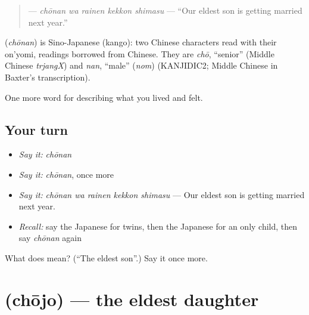\begin{quote}
\textbf{  } — \emph{chōnan wa rainen kekkon shimasu} — \textquotedblleft{}Our eldest son is getting married next year.\textquotedblright{}
\end{quote}

\begin{cousinweb}
\textbf{} (\emph{chōnan}) is Sino-Japanese (kango): two Chinese characters read with their on'yomi, readings borrowed from Chinese. They are \emph{chō}, \textquotedblleft{}senior\textquotedblright{} (Middle Chinese \emph{trjangX}) and \emph{nan}, \textquotedblleft{}male\textquotedblright{} (\emph{nom}) (KANJIDIC2; Middle Chinese in Baxter's transcription).
\end{cousinweb}

\begin{grammarlens}[title={What you've built}]
One more word for describing what you lived and felt.
\end{grammarlens}

\subsection*{Your turn}
\begin{itemize}
\raggedright
  \item \emph{Say it:} \emph{chōnan}
  \item \emph{Say it:} \emph{chōnan}, once more
  \item \emph{Say it:} \emph{chōnan wa rainen kekkon shimasu} — Our eldest son is getting married next year.
  \item \emph{Recall:} say the Japanese for twins, then the Japanese for an only child, then say \emph{chōnan} again
\end{itemize}

\begin{tcolorbox}[breakable,colback=teal!4,colframe=teal!35!black,title={Before you move on}]
What does  mean? (\textquotedblleft{}The eldest son\textquotedblright{}.) Say it once more.
\end{tcolorbox}
\section[\texorpdfstring{\ja{ちょうじょ} (chōjo)}{ちょうじょ (chōjo)}]{ (chōjo) — the eldest daughter}

\label{lesson:JA-C476-choujo}



